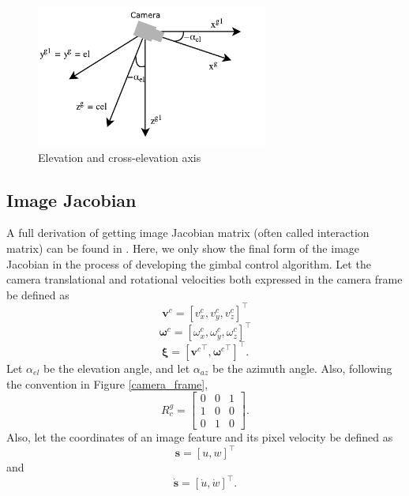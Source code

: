 \begin{figure}[htbp]
	\centering
	\includegraphics[width = 3in]{images/chapter2/cross_elevation.pdf}
	\caption{Elevation and cross-elevation axis}
	\label{cross_elevation}
\end{figure}
\subsection{Image Jacobian}
A full derivation of getting image Jacobian matrix (often called interaction matrix) can be found in \cite{spong2006robot}. Here, we only show the final form of the image Jacobian in the process of developing the gimbal control algorithm. Let the camera translational and rotational velocities both expressed in the camera frame be defined as
\begin{equation}
\mathbf{v}^c=[v_x^c, v_y^c, v_z^c]^\top
\end{equation}
\begin{equation}
\mathbf{\omega}^c=[\omega_x^c, \omega_y^c, \omega_z^c]^\top
\end{equation}
\begin{equation}
\mathbf{\xi}=[{\mathbf{v}^c}^\top, {\mathbf{\omega}^c}^\top]^\top.
\label{camera_velocity}
\end{equation}
Let $\alpha_{el}$ be the elevation angle, and let $\alpha_{az}$ be the azimuth angle. Also, following the convention in Figure \ref{camera_frame}, 
\begin{equation}
R^{g}_c =
\begin{bmatrix}
0 & 0 & 1 \\
1 & 0 & 0 \\
0 & 1 & 0
\end{bmatrix}.
\end{equation}
Also, let the coordinates of an image feature and its pixel velocity be defined as 
\begin{equation}
\mathbf{s}=[u, w]^\top
\end{equation}
and 
\begin{equation}
\mathbf{\dot{s}}=[\dot{u}, \dot{w}]^\top.
\label{image_feature_velocity}
\end{equation}
